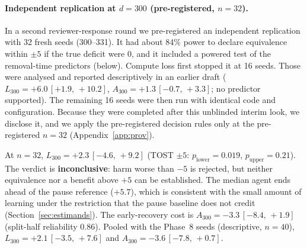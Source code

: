 \documentclass[10pt]{article} %
\newcommand{\ci}[2]{\,[#1,\,#2]}
\begin{document}
\paragraph{Independent replication at $d=300$ (pre-registered, $n=32$).}
In a second reviewer-response round we pre-registered an independent replication with 32 fresh seeds (300--331). It had about 84\% power to declare equivalence within $\pm5$ if the true deficit were 0, and it included a powered test of the removal-time predictors (below). Compute loss first stopped it at 16 seeds. Those were analysed and reported descriptively in an earlier draft ($L_{300}=+6.0\ci{+1.9}{+10.2}$, $A_{300}=+1.3\ci{-0.7}{+3.3}$; no predictor supported). The remaining 16 seeds were then run with identical code and configuration. Because they were completed after this unblinded interim look, we disclose it, and we apply the pre-registered decision rules only at the pre-registered $n=32$ (Appendix~\ref{app:prov}).

At $n=32$, $L_{300}=+2.3\ci{-4.6}{+9.2}$ (TOST $\pm5$: $p_{\text{lower}}=0.019$, $p_{\text{upper}}=0.21$). The verdict is \textbf{inconclusive}: harm worse than $-5$ is rejected, but neither equivalence nor a benefit above $+5$ can be established. The median agent ends ahead of the pause reference ($+5.7$), which is consistent with the small amount of learning under the restriction that the pause baseline does not credit (Section~\ref{sec:estimands}). The early-recovery cost is $A_{300}=-3.3\ci{-8.4}{+1.9}$ (split-half reliability 0.86). Pooled with the Phase~8 seeds (descriptive, $n=40$), $L_{300}=+2.1\ci{-3.5}{+7.6}$ and $A_{300}=-3.6\ci{-7.8}{+0.7}$.
\end{document}
